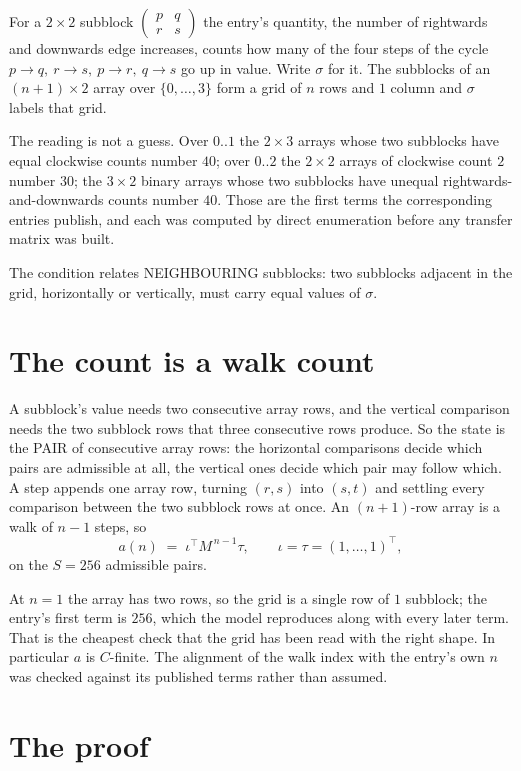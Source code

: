 \documentclass[11pt,a4paper]{article}
\theoremstyle{plain}
\theoremstyle{definition}
\begin{document}
For a $2\times2$ subblock $\begin{pmatrix}p&q\\r&s\end{pmatrix}$ the
entry's quantity, the number of rightwards and downwards edge increases, counts how many of the four steps of the cycle $p\to q,\ r\to s,\ p\to r,\ q\to s$ go up in value. Write $\sigma$ for it. The subblocks of an
$(n+1)\times2$ array over $\{0,\dots,3\}$ form a grid of $n$ rows and $1$
column and $\sigma$ labels that grid.

The reading is not a guess. Over $0..1$ the $2\times3$ arrays whose two subblocks have equal
clockwise counts number $40$; over $0..2$ the $2\times2$ arrays of clockwise count $2$ number
$30$; the $3\times2$ binary arrays whose two subblocks have unequal rightwards-and-downwards
counts number $40$. Those are the first terms the corresponding entries publish, and each was
computed by direct enumeration before any transfer matrix was built.

The condition relates NEIGHBOURING subblocks: two subblocks adjacent in the grid, horizontally
or vertically, must carry equal values of $\sigma$.

\section{The count is a walk count}

A subblock's value needs two consecutive array rows, and the vertical
comparison needs the two subblock rows that three consecutive rows produce. So the state is the
PAIR of consecutive array rows: the horizontal comparisons decide which pairs are admissible at
all, the vertical ones decide which pair may follow which. A step appends one array row,
turning $(r,s)$ into $(s,t)$ and settling every comparison between the two subblock rows at
once. An $(n+1)$-row array is a walk of $n-1$ steps, so
\[
a(n)\;=\;\iota^{\!\top}M^{\,n-1}\tau,\qquad\iota=\tau=(1,\dots,1)^{\!\top},
\]
on the $S=256$ admissible pairs.

At $n=1$ the array has two rows, so the grid is a single row of $1$
subblock; the entry's first term is $256$, which the model
reproduces along with every later term. That is the cheapest check that the grid has been read
with the right shape.
In particular $a$ is $C$-finite. The alignment of the walk index with the entry's own $n$ was
checked against its published terms rather than assumed.

\section{The proof}
\end{document}
